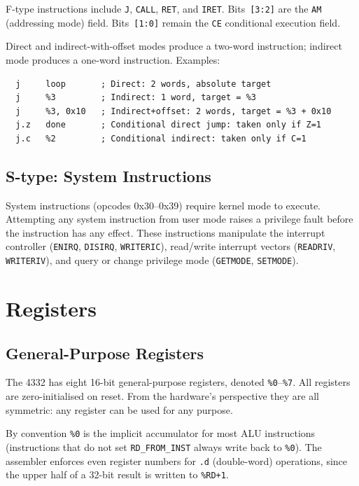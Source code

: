 \documentclass[a4paper,12pt]{report}
\newcommand{\asm}[1]{\texttt{#1}}
\newcommand{\field}[1]{\texttt{\small #1}}
\newcommand{\reg}[1]{\texttt{\%#1}}
\begin{document}
F-type instructions include \asm{J}, \asm{CALL}, \asm{RET}, and \asm{IRET}. Bits~\field{[3:2]} are the \field{AM} (addressing mode) field. Bits~\field{[1:0]} remain the \field{CE} conditional execution field.

Direct and indirect-with-offset modes produce a two-word instruction; indirect mode produces a one-word instruction. Examples:

\begin{lstlisting}
  j     loop       ; Direct: 2 words, absolute target
  j     %3         ; Indirect: 1 word, target = %3
  j     %3, 0x10   ; Indirect+offset: 2 words, target = %3 + 0x10
  j.z   done       ; Conditional direct jump: taken only if Z=1
  j.c   %2         ; Conditional indirect: taken only if C=1
\end{lstlisting}

\subsection{S-type: System Instructions}

System instructions (opcodes 0x30--0x39) require kernel mode to execute. Attempting any system instruction from user mode raises a privilege fault before the instruction has any effect. These instructions manipulate the interrupt controller (\asm{ENIRQ}, \asm{DISIRQ}, \asm{WRITERIC}), read/write interrupt vectors (\asm{READRIV}, \asm{WRITERIV}), and query or change privilege mode (\asm{GETMODE}, \asm{SETMODE}).

\section{Registers}
\label{sec:registers}

\subsection{General-Purpose Registers}

The 4332 has eight 16-bit general-purpose registers, denoted \reg{0}--\reg{7}. All registers are zero-initialised on reset. From the hardware's perspective they are all symmetric: any register can be used for any purpose.

By convention \reg{0} is the implicit accumulator for most ALU instructions (instructions that do not set \field{RD\_FROM\_INST} always write back to \reg{0}). The assembler enforces even register numbers for \asm{.d} (double-word) operations, since the upper half of a 32-bit result is written to \reg{RD+1}.
\end{document}
